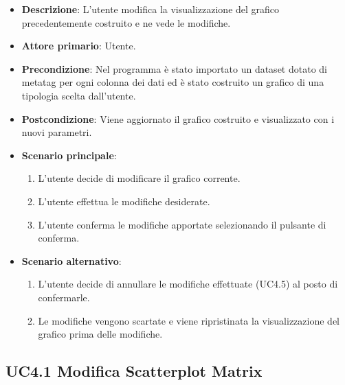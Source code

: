 \begin{itemize}
    \item \textbf{Descrizione}: L’utente modifica la visualizzazione del grafico precedentemente costruito
                                e ne vede le modifiche.
	
    \item \textbf{Attore primario}: Utente.
    
    \item \textbf{Precondizione}:   Nel programma è stato importato un dataset dotato di metatag per ogni
                                    colonna dei dati ed è stato costruito un grafico di una tipologia scelta dall'utente.

    \item \textbf{Postcondizione}:  Viene aggiornato il grafico costruito e visualizzato con i nuovi parametri.

	\item \textbf{Scenario principale}:
		\begin{enumerate}
			\item L'utente decide di modificare il grafico corrente.
			\item L'utente effettua le modifiche desiderate.
            \item L'utente conferma le modifiche apportate selezionando il pulsante di conferma.
        \end{enumerate}

    \item \textbf{Scenario alternativo}:
        \begin{enumerate}
            \item L'utente decide di annullare le modifiche effettuate (UC4.5) al posto di confermarle.   
            \item Le modifiche vengono scartate e viene ripristinata la visualizzazione del grafico prima delle modifiche.
        \end{enumerate}
    
\end{itemize}


\subsection{UC4.1 Modifica Scatterplot Matrix}





